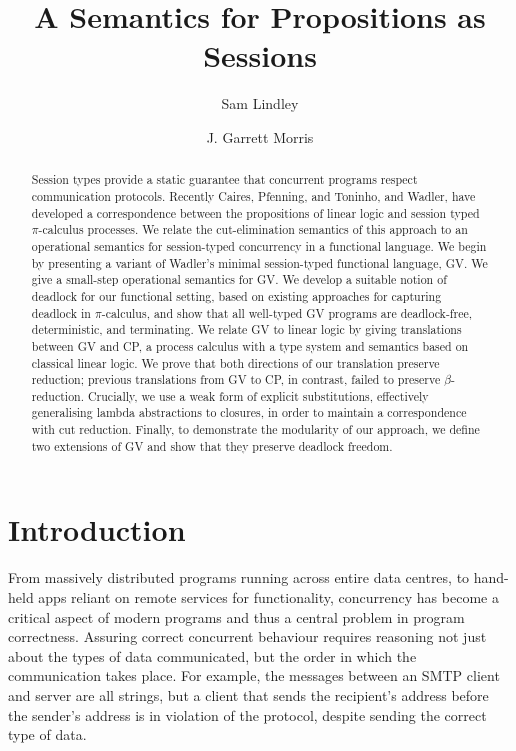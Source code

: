 \documentclass[oribibl,orivec,envcountsame]{llncs}
\title{A Semantics for Propositions as Sessions}
\author{Sam Lindley \and J. Garrett Morris}
\institute{The University of Edinburgh \\
           \email{\{Sam.Lindley,Garrett.Morris\}@ed.ac.uk} \vspace{-5mm}}
\begin{document}
\maketitle

\begin{abstract}
  Session types provide a static guarantee that concurrent programs respect communication
  protocols. Recently Caires, Pfenning, and Toninho, and Wadler, have developed a correspondence
  between the propositions of linear logic and session typed $\pi$-calculus processes.
%
  We relate the cut-elimination semantics of this approach to an operational semantics for
  session-typed concurrency in a functional language.
%
  We begin by presenting a variant of Wadler's minimal session-typed functional language, GV. We
  give a small-step operational semantics for GV. We develop a suitable notion of deadlock for our
  functional setting, based on existing approaches for capturing deadlock in $\pi$-calculus, and
  show that all well-typed GV programs are deadlock-free, deterministic, and terminating.
%
  We relate GV to linear logic by giving translations between GV and CP, a process calculus with a
  type system and semantics based on classical linear logic.  We prove that both directions of our
  translation preserve reduction; previous translations from GV to CP, in contrast, failed to
  preserve $\beta$-reduction. Crucially, we use a weak form of explicit substitutions, effectively
  generalising lambda abstractions to closures, in order to maintain a correspondence with cut
  reduction.
%
  Finally, to demonstrate the modularity of our approach, we define two extensions of GV and show
  that they preserve deadlock freedom.
\end{abstract}

\section{Introduction}\label{sec:intro}

From massively distributed programs running across entire data centres, to hand-held apps reliant on
remote services for functionality, concurrency has become a critical aspect of modern programs and
thus a central problem in program correctness. Assuring correct concurrent behaviour requires
reasoning not just about the types of data communicated, but the order in which the communication
takes place. For example, the messages between an SMTP client and server are all strings, but a
client that sends the recipient's address before the sender's address is in violation of the
protocol, despite sending the correct type of data.
\end{document}
